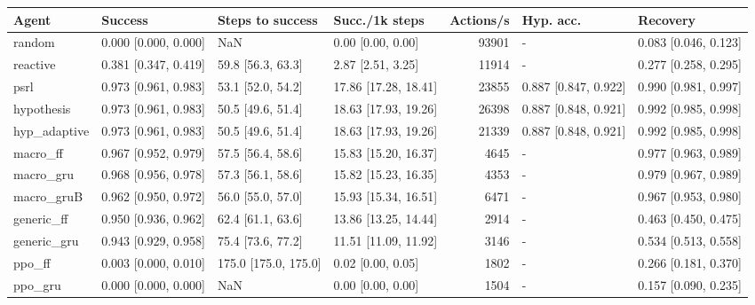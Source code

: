 \begin{tabular}{llllrll}
\toprule
Agent & Success & Steps to success & Succ./1k steps & Actions/s & Hyp. acc. & Recovery \\
\midrule
random & 0.000 [0.000, 0.000] & NaN & 0.00 [0.00, 0.00] & 93901 & - & 0.083 [0.046, 0.123] \\
reactive & 0.381 [0.347, 0.419] & 59.8 [56.3, 63.3] & 2.87 [2.51, 3.25] & 11914 & - & 0.277 [0.258, 0.295] \\
psrl & 0.973 [0.961, 0.983] & 53.1 [52.0, 54.2] & 17.86 [17.28, 18.41] & 23855 & 0.887 [0.847, 0.922] & 0.990 [0.981, 0.997] \\
hypothesis & 0.973 [0.961, 0.983] & 50.5 [49.6, 51.4] & 18.63 [17.93, 19.26] & 26398 & 0.887 [0.848, 0.921] & 0.992 [0.985, 0.998] \\
hyp\_adaptive & 0.973 [0.961, 0.983] & 50.5 [49.6, 51.4] & 18.63 [17.93, 19.26] & 21339 & 0.887 [0.848, 0.921] & 0.992 [0.985, 0.998] \\
macro\_ff & 0.967 [0.952, 0.979] & 57.5 [56.4, 58.6] & 15.83 [15.20, 16.37] & 4645 & - & 0.977 [0.963, 0.989] \\
macro\_gru & 0.968 [0.956, 0.978] & 57.3 [56.1, 58.6] & 15.82 [15.23, 16.35] & 4353 & - & 0.979 [0.967, 0.989] \\
macro\_gruB & 0.962 [0.950, 0.972] & 56.0 [55.0, 57.0] & 15.93 [15.34, 16.51] & 6471 & - & 0.967 [0.953, 0.980] \\
generic\_ff & 0.950 [0.936, 0.962] & 62.4 [61.1, 63.6] & 13.86 [13.25, 14.44] & 2914 & - & 0.463 [0.450, 0.475] \\
generic\_gru & 0.943 [0.929, 0.958] & 75.4 [73.6, 77.2] & 11.51 [11.09, 11.92] & 3146 & - & 0.534 [0.513, 0.558] \\
ppo\_ff & 0.003 [0.000, 0.010] & 175.0 [175.0, 175.0] & 0.02 [0.00, 0.05] & 1802 & - & 0.266 [0.181, 0.370] \\
ppo\_gru & 0.000 [0.000, 0.000] & NaN & 0.00 [0.00, 0.00] & 1504 & - & 0.157 [0.090, 0.235] \\
\bottomrule
\end{tabular}
